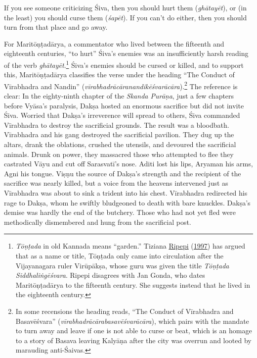 \begin{pullquote}\raggedright
      If you see someone criticizing Śiva, then you should hurt them (\emph{ghātayēt}), or (in the least) you should curse them (\emph{śapēt}). If you can’t do either, then you should turn from that place and go away.\footnotemark{}

\end{pullquote}

For Maritōṇṭadārya, a commentator who lived between the fifteenth and eighteenth centuries, “to hurt” Śiva’s enemies was an insufficiently harsh reading of the verb \emph{ghātayēt}.\footnote{%
\emph{Tōṇṭada} in old Kannada means “garden.” Tiziana \hyperref[Ripepi1997]{Ripepi} (\hyperref[Ripepi1997]{1997}) has argued that as a name or title, Tōṇṭada only came into circulation after the Vijayanagara ruler Virūpākṣa, whose guru was given the title \emph{Tōṇṭada Siddhaliṅgēśvara}. Ripepi disagrees with Jan Gonda, who dates Maritōṇṭadārya to the fifteenth century. She suggests instead that he lived in the eighteenth century.
}
 Śiva’s enemies should be cursed or killed, and to support this, Maritōṇṭadārya classifies the verse under the heading “The Conduct of Vīrabhadra and Nandin” (\emph{vīrabhadrācāranandikēśvarācāra}).\footnote{%
In some recensions the heading reads, “The Conduct of Vīrabhadra and Basavēśvara” (\emph{vīrabhadrācārabasavēśvarācāra}), which pairs with the mandate to turn away and leave if one is not able to curse or beat, which is an homage to a story of Basava leaving Kalyāṇa after the city was overrun and looted by marauding anti-Śaivas.
}
 The reference is clear: In the eighty-ninth chapter of the \emph{{Skanda Purāṇa}}, just a few chapters before Vyāsa’s paralysis, Dakṣa hosted an enormous sacrifice but did not invite Śiva. Worried that Dakṣa’s irreverence will spread to others, Śiva commanded Vīrabhadra to destroy the sacrificial grounds. The result was a bloodbath. Vīrabhadra and his gang destroyed the sacrificial pavilion. They dug up the altars, drank the oblations, crushed the utensils, and devoured the sacrificial animals. Drunk on power, they massacred those who attempted to flee  \Dash  they castrated Vāyu and cut off Sarasvatī’s nose. Aditi lost his lips, Aryaman his arms, Agni his tongue. Viṣṇu  \Dash  the source of Dakṣa’s strength and the recipient of the sacrifice  \Dash  was nearly killed, but a voice from the heavens intervened just as Vīrabhadra was about to sink a trident into his chest. Vīrabhadra redirected his rage to Dakṣa, whom he swiftly bludgeoned to death with bare knuckles. Dakṣa’s demise was hardly the end of the butchery. Those who had not yet fled were methodically dismembered and hung from the sacrificial post.


